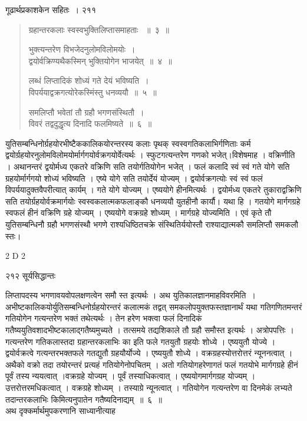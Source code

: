 \documentclass[11pt, openany]{book}
\begin{document}
\newpage

\hspace{3cm} गूढार्थप्रकाशकेन सहितः~। \hfill २११
\vspace{1cm}


 \begin{quote}
{\ssi ग्रहान्तरकलाः स्वस्वभुक्तिलिप्तासमाहताः ~॥~३~॥
 
भुक्त्यन्तरेण विभजेदनुलोमविलोमयोः~।\\
द्वयोर्वक्रिण्यथैकस्मिन् भुक्तियोगेन भाजयेत्~॥~४~॥

लब्धं लिप्तादिकं शोध्यं गते देयं भविष्यति~।\\
विपर्ययाद्वक्रगत्योरेकस्मिंस्तु धनव्ययौ~॥~५~॥

समलिप्तौ भवेतां तौ ग्रहौ भगणसंस्थितौ~।\\
विवरं तद्वदुद्धृत्य दिनादि फलमिष्यते~॥~६~॥ }
\end{quote}


 युतिसम्बन्धिनोर्ग्रहयोरभीष्टैककालिकयोरन्तरस्य कलाः पृथक् स्वस्वगतिकलाभिर्गणिताः कर्म द्वयोर्ग्रहयोरनुलोमविलोमयोर्मार्गगयोर्वक्रगयोर्वेत्यर्थः । स्फुटगत्यन्तरेण गणको भजेत्।विशेषमाह । वक्रिणीति । अथानन्तरं द्वयोर्मध्य एकतरे वक्रिणि सति तयोर्गतियोगेन भजेत् । फलं कलादि स्वं स्वं गते योगे सति ग्रहयोर्मार्गगयो शोध्यं भविष्यति । एष्ये योगे सति तयोर्देयं योज्यम् । द्वयोर्वक्रगत्योः स्वं स्वं फलं विपर्ययादुक्तवैपरीत्यात् कार्यम् । गते योगे योज्यम् । एष्ययोगे हीनमित्यर्थः । द्वयोर्मध्य एकतरे तुकाराद्वक्रिणि सति तयोर्ग्रहयोर्वक्रमार्गयोः स्वस्वकलात्मकफलाङ्कौ धनव्ययौ युतहीनौ कार्यौ। यथा हि । गतयोगे मार्गगग्रहे स्वफलं हीनं वक्रिणि ग्रहे योज्यम् । एष्ययोगे वक्रग्रहे शोध्यम् । मार्गग्रहे योज्यमिति । एवं कृते तौ युतिसम्बन्धिनौ ग्रहौ भगणसंस्थौ भगणे राश्यधिष्ठितचक्रे संस्थितिर्ययोस्तौ राश्याद्यात्मकौ समलिप्तौ समकलौ स्तः।


{\tiny{2 D 2}}

\newpage


\noindent २१२ \hspace{4cm} सूर्यसिद्धान्तः 
\vspace{1cm}


 
\noindent लिप्तापदस्य भगणावयवोपलक्षणत्वेन समौ स्त इत्यर्थः । अथ युतिकालज्ञानमाह\textendash विवरमिति~। अभीष्टकालिकयोर्युतिसम्बन्धिनोर्ग्रहयोरन्तरं कलात्मकं तद्वत् समकलोपयुक्तफस्तज्ञानार्थं यथा गतिगणितमन्तरं गतियोगेन गत्यन्तरेण भक्तं तथेत्यर्थः । तेन हरेण भक्त्वा फलं दिनादिकं गतैष्ययुतिवशादभीष्टकालाद्गतैष्यमुच्यते । तत्समये तद्यशिकाले तौ ग्रहौ समौस्त इत्यर्थः । अत्रोपपत्तिः । गत्यन्तरेण गतिकलास्तदा ग्रहान्तरकलाभिः का इति फले गतयुतौ ग्रहयोः शोध्ये । एष्ययुतौ योज्ये । द्वयोर्वक्रत्वे गत्यन्तरभक्तफले गतद्युतौ ग्रहयौर्योज्ये । एष्ययुतौ शोध्ये । वक्रग्रहस्योत्तरोत्तरं न्यूननत्वात् । अथैको वक्रो तदा तयोरन्तरं प्रत्यहं गतियोगेनोपचितम् । अतो गतियोगहरेणागतं फलं गतयोभे मार्गगग्रहे हीनं पूर्वं तस्य न्ययत्वात् ।वक्रग्रहे योज्यम् । पूर्वं तस्याधिकत्वात् । एष्ययोगमार्गगग्रह योज्यम् । उत्तरोत्तरमधिकत्वात् । वक्रग्रहे शोध्यम् । तस्याग्रे न्यूनत्वात् । गतियोगेन गत्यन्तरेण वा दिनमेकं लभ्यते तदान्तरकलाभिः किमित्यनुपातेन गतैष्यदिनाद्यम्~॥~६~॥\\
\noindent अथ दृक्कर्मार्थमुपकरणानि साध्यानीत्याह \textendash 
\end{document}
